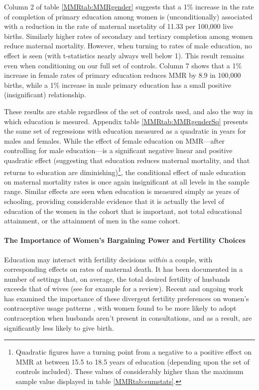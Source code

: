 \documentclass{article}[12pt,subeqn]
\begin{document}
\begin{spacing}{1.4}
Column 2 of table \ref{MMRtab:MMRgender} suggests that a 1\% increase in the
rate of completion of primary education among women is (unconditionally) 
associated with a reduction in the rate of maternal mortality of 11.33 per 
100,000 live births.  Similarly higher rates of secondary and tertiary 
completion among women reduce maternal mortality.  However, when turning to 
rates of male education, no effect is seen (with t-statistics nearly always
well below 1).  This result remains even when conditioning on our full set
of controls.  Column 7 shows that a 1\% increase in female rates of primary
education reduces MMR by 8.9 in 100,000 births, while a 1\% increase in male
primary education has a small positive (insignificant) relationship.

These results are stable regardless of the set of controls used, and also the
way in which education is mesured.  Appendix table \ref{MMRtab:MMRgenderSq} 
presents the same set of regressions with education measured as a quadratic
in years for males and females.  While the effect of female education on 
MMR---after controlling for male education---is a significant negative linear 
and positive quadratic effect (suggesting that education reduces maternal 
mortality, and that returns to education are diminishing)\footnote{Quadratic 
figures have a turning point from a negative to a positive effect on MMR at 
between 15.5 to 18.5 years of education (depending upon the set of controls 
included).  These values of considerably higher than the maximum sample value 
displayed in table \ref{MMRtab:sumstats}.}, the conditional effect of male 
education on maternal mortality rates is once again insignificant at all
levels in the sample range.  Similar effects are seen when education is
measured simply as years of schooling, providing considerable evidence that
it is actually the level of education of the women in the cohort that is 
important, not total educational attainment, or the attainment of men in the 
same cohort.

\paragraph{The Importance of Women's Bargaining Power and Fertility Choices}
Education may interact with fertility decisions \emph{within} a couple, with
corresponding effects on rates of maternal death.  It has been documented in
a number of settings that, on average, the total desired fertility of
husbands exceeds that of wives (see for example \citet{UN2001} for a review).
Recent and ongoing work has examined the importance of these divergent
fertility preferences on women's contraceptive usage patterns
\citep{Ashrafetal2014}, with women found to be more likely to adopt
contraception when husbands aren't present in consultations, and as a
result, are significantly less likely to give birth.


\end{spacing}
\end{document}
